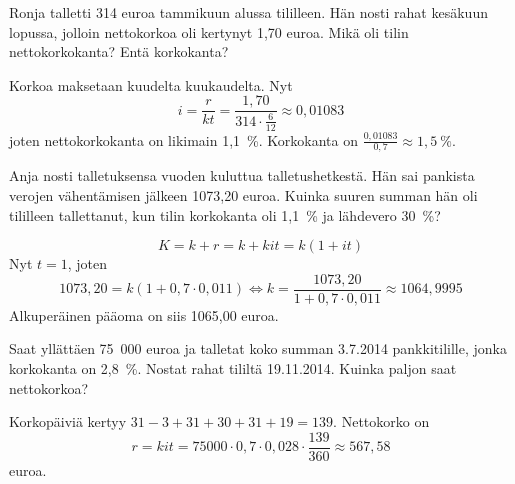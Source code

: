 \documentclass[a4paper,10pt]{article}\usepackage[]{graphicx}\usepackage[]{color}
\begin{document}
\begin{question} Ronja talletti 314 euroa tammikuun alussa tililleen. Hän nosti rahat kesäkuun lopussa, jolloin nettokorkoa oli kertynyt
 1,70 euroa. Mikä oli tilin nettokorkokanta? Entä korkokanta?
\end{question}\begin{solution}
    Korkoa maksetaan kuudelta kuukaudelta. Nyt
    \[
        i = \frac{r}{kt} = \frac{1,70}{314\cdot\frac{6}{12}}\approx 0,01083
    \]
    joten nettokorkokanta  on likimain 1,1~\%. Korkokanta on \(\frac{0,01083}{0,7}\approx 1,5~\%\).
\end{solution}

\begin{question} Anja nosti talletuksensa vuoden kuluttua talletushetkestä. Hän sai pankista verojen vähentämisen jälkeen 1073,20 euroa.
 Kuinka suuren summan hän oli tililleen tallettanut, kun tilin korkokanta oli 1,1~\% ja lähdevero 30~\%?
\end{question}
\begin{solution}
    \[
        K = k + r = k + kit = k(1+it)
    \]
    Nyt \(t = 1\), joten
    \[
        1073,20 = k(1+0,7\cdot0,011)\Leftrightarrow k = \frac{1073,20}{1+0,7\cdot0,011} \approx 1064,9995
    \]
    Alkuperäinen pääoma on siis 1065,00 euroa.
\end{solution}

\begin{question} Saat yllättäen 75~000 euroa ja talletat koko summan 3.7.2014 pankkitilille, jonka korkokanta on 2{,}8~\%. Nostat rahat tililtä 19.11.2014. Kuinka paljon saat nettokorkoa?
\end{question}
\begin{solution}
    Korkopäiviä kertyy \(31-3+31+30+31+19 = 139\). Nettokorko on
    \[
        r = kit = 75000\cdot0,7\cdot 0,028\cdot\frac{139}{360}\approx 567,58
    \]
    euroa.
\end{solution}
\end{document}
